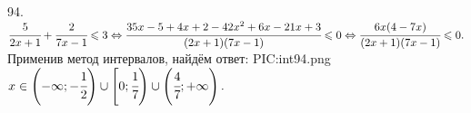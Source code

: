 94. $\cfrac{5}{2x+1}+\cfrac{2}{7x-1}\leqslant3\Leftrightarrow\cfrac{35x-5+4x+2-42x^2+6x-21x+3}{(2x+1)(7x-1)}\leqslant 0\Leftrightarrow
\cfrac{6x(4-7x)}{(2x+1)(7x-1)}\leqslant 0.$ Применив метод интервалов, найдём ответ:
{{PIC:int94.png}}
$x\in\left(-\infty;-\cfrac{1}{2}\right)\cup\left[0;\cfrac{1}{7}\right)\cup\left(\cfrac{4}{7};+\infty\right).$\\
